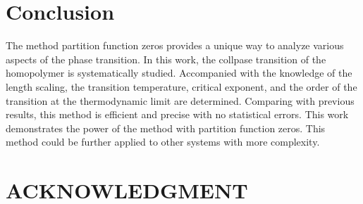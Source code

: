 \documentclass[preprint,preprintnumbers,amsmath,amssymb,showpacs,aps,pre]{revtex4-1}
\begin{document}
\section{Conclusion}

The method partition function zeros provides a unique way to analyze various
aspects of the phase transition. In this work, the collpase transition of the
homopolymer is systematically studied. Accompanied with the knowledge of the
length scaling, the transition temperature, critical exponent, and the order
of the transition at the thermodynamic limit are determined. Comparing with
previous results, this method is efficient and precise with no statistical
errors. This work demonstrates the power of the method with partition function
zeros. This method could be further applied to other systems with more
complexity.

\section*{ACKNOWLEDGMENT}
\end{document}
